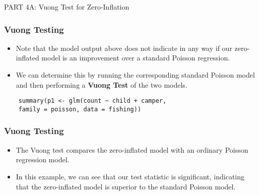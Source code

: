 \documentclass[MASTER.tex]{subfiles}
\begin{document}
%	
%	
\begin{frame}
	
	{\LARGE
		PART 4A:	Vuong Test for Zero-Inflation
	} \bigskip
	\Large
	

\end{frame}
\begin{frame}[fragile]
\frametitle{Vuong Testing}
	\begin{itemize}
		\item Note that the model output above does not indicate in any way if our zero-inflated model is an improvement over a standard Poisson regression. 
		\item We can determine this by running the corresponding standard Poisson model and then performing a \textbf{Vuong Test} of the two models.
	\end{itemize}
	\begin{verbatim}
	summary(p1 <- glm(count ~ child + camper, 
	family = poisson, data = fishing))
	\end{verbatim}
\end{frame}
\begin{frame}[fragile]
	\frametitle{Vuong Testing}
	\large
	\begin{itemize}
		\item The Vuong test compares the zero-inflated model with an ordinary Poisson regression model. 
		\item In this example, we can see that our test statistic is significant, indicating that the zero-inflated model is superior to the standard Poisson model.
	\end{itemize}
\end{frame}
\end{document}
